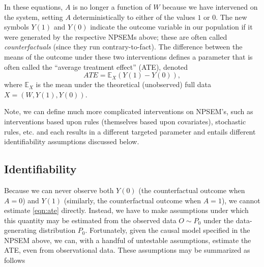 \documentclass[
  12pt, krantz2,
]{book}
\theoremstyle{definition}
\theoremstyle{definition}
\theoremstyle{definition}
\newcommand{\1}{\mathbbm{1}}
\begin{document}
In these equations, \(A\) is no longer a function of \(W\) because we have
intervened on the system, setting \(A\) deterministically to either of the values
\(1\) or \(0\). The new symbols \(Y(1)\) and \(Y(0)\) indicate the outcome variable in
our population if it were generated by the respective NPSEMs above; these are
often called \emph{counterfactuals} (since they run contrary-to-fact). The difference
between the means of the outcome under these two interventions defines a
parameter that is often called the ``average treatment effect'' (ATE), denoted
\begin{equation}\label{eqn:ate}
  ATE = \mathbb{E}_X(Y(1)-Y(0)),
\end{equation}
where \(\mathbb{E}_X\) is the mean under the theoretical (unobserved) full data
\(X = (W, Y(1), Y(0))\).

Note, we can define much more complicated interventions on NPSEM's, such as
interventions based upon rules (themselves based upon covariates), stochastic
rules, etc. and each results in a different targeted parameter and entails
different identifiability assumptions discussed below.

\hypertarget{identifiability}{%
\subsection{Identifiability}\label{identifiability}}

Because we can never observe both \(Y(0)\) (the counterfactual outcome when \(A=0\))
and \(Y(1)\) (similarly, the counterfactual outcome when \(A=1\)), we cannot
estimate \ref{eqn:ate} directly. Instead, we have to make assumptions under
which this quantity may be estimated from the observed data \(O \sim P_0\) under
the data-generating distribution \(P_0\). Fortunately, given the causal model
specified in the NPSEM above, we can, with a handful of untestable assumptions,
estimate the ATE, even from observational data. These assumptions may be
summarized as follows
\end{document}
